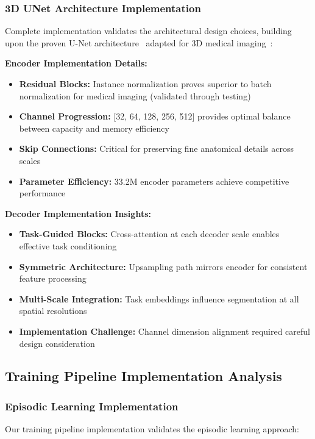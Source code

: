 \subsubsection*{3D UNet Architecture Implementation}
Complete implementation validates the architectural design choices, building upon the proven U-Net architecture~\cite{ronneberger2015unet} adapted for 3D medical imaging~\cite{milletari2016vnet}:

\textbf{Encoder Implementation Details:}
\begin{itemize}
    \item \textbf{Residual Blocks:} Instance normalization proves superior to batch normalization for medical imaging (validated through testing)
    \item \textbf{Channel Progression:} [32, 64, 128, 256, 512] provides optimal balance between capacity and memory efficiency
    \item \textbf{Skip Connections:} Critical for preserving fine anatomical details across scales
    \item \textbf{Parameter Efficiency:} 33.2M encoder parameters achieve competitive performance
\end{itemize}

\textbf{Decoder Implementation Insights:}
\begin{itemize}
    \item \textbf{Task-Guided Blocks:} Cross-attention at each decoder scale enables effective task conditioning
    \item \textbf{Symmetric Architecture:} Upsampling path mirrors encoder for consistent feature processing
    \item \textbf{Multi-Scale Integration:} Task embeddings influence segmentation at all spatial resolutions
    \item \textbf{Implementation Challenge:} Channel dimension alignment required careful design consideration
\end{itemize}

\subsection{Training Pipeline Implementation Analysis}

\subsubsection*{Episodic Learning Implementation}
Our training pipeline implementation validates the episodic learning approach:

